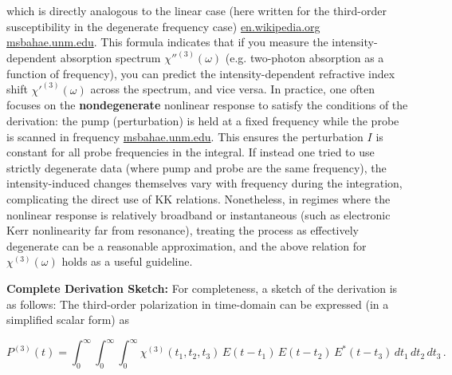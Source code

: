 \documentclass[11pt,a4paper]{article}
\begin{document}
which is directly analogous to the linear case (here written for the third-order susceptibility in the degenerate frequency case) \href{https://en.wikipedia.org/wiki/Kramers%E2%80%93Kronig_relations}{en.wikipedia.org} \href{https://msbahae.unm.edu/Courses/568%20Nonlinear%20Optics/OSA-Handbook%20of%20Optics-IV-Ch17.pdf}{msbahae.unm.edu}. This formula indicates that if you measure the intensity-dependent absorption spectrum $\chi''^{(3)}(\omega)$ (e.g. two-photon absorption as a function of frequency), you can predict the intensity-dependent refractive index shift $\chi'^{(3)}(\omega)$ across the spectrum, and vice versa. In practice, one often focuses on the \textbf{nondegenerate} nonlinear response to satisfy the conditions of the derivation: the pump (perturbation) is held at a fixed frequency while the probe is scanned in frequency \href{https://msbahae.unm.edu/Courses/568%20Nonlinear%20Optics/OSA-Handbook%20of%20Optics-IV-Ch17.pdf}{msbahae.unm.edu}. This ensures the perturbation $I$ is constant for all probe frequencies in the integral. If instead one tried to use strictly degenerate data (where pump and probe are the same frequency), the intensity-induced changes themselves vary with frequency during the integration, complicating the direct use of KK relations. Nonetheless, in regimes where the nonlinear response is relatively broadband or instantaneous (such as electronic Kerr nonlinearity far from resonance), treating the process as effectively degenerate can be a reasonable approximation, and the above relation for $\chi^{(3)}(\omega)$ holds as a useful guideline.

\textbf{Complete Derivation Sketch:} For completeness, a sketch of the derivation is as follows: The third-order polarization in time-domain can be expressed (in a simplified scalar form) as

$$
P^{(3)}(t) = \int_0^{\infty}\!\!\int_0^{\infty}\!\!\int_0^{\infty} \chi^{(3)}(t_1,t_2,t_3)\, E(t-t_1)\, E(t-t_2)\, E^{*}(t-t_3)\, dt_1\, dt_2\, dt_3\,.
$$
\end{document}
